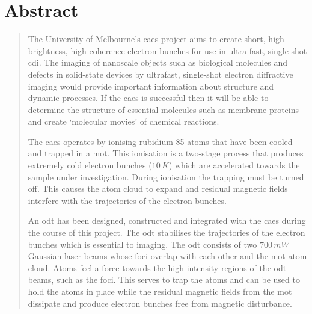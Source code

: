 \chapter*{\centering \LARGE Abstract}
\begin{quotation}
\noindent

The University of Melbourne's \gls{caes} project aims to create short, high-brightness, high-coherence electron bunches for use in ultra-fast, single-shot \gls{cdi}. The imaging of nanoscale objects such as biological molecules \cite{dwyer_femtosecond_2006, williamson_clocking_1997} and defects in solid-state devices \cite{siwick_atomic-level_2003} by ultrafast, single-shot electron diffractive imaging would provide important information about structure and dynamic processes. If the \gls{caes} is successful then it will be able to determine the structure of essential molecules such as membrane proteins and create `molecular movies' of chemical reactions.

The \gls{caes} operates by ionising rubidium-85 atoms that have been cooled and trapped in a \gls{mot}. This ionisation is a two-stage process that produces extremely cold electron bunches ($10\,\unit{K}$) which are accelerated towards the sample under investigation. During ionisation the trapping must be turned off. This causes the atom cloud to expand and residual magnetic fields interfere with the trajectories of the electron bunches.

An \gls{odt} has been designed, constructed and integrated with the \gls{caes} during the course of this project. The \gls{odt} stabilises the trajectories of the electron bunches which is essential to imaging. The \gls{odt} consists of two $700\,\unit{mW}$ Gaussian laser beams whose foci overlap with each other and the \gls{mot} atom cloud. Atoms feel a force towards the high intensity regions of the \gls{odt} beams, such as the foci. This serves to trap the atoms and can be used to hold the atoms in place while the residual magnetic fields from the \gls{mot} dissipate and produce electron bunches free from magnetic disturbance.

\end{quotation}
\clearpage
